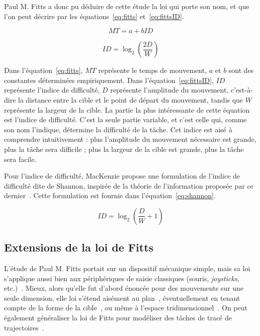 	Paul M. Fitts a donc pu déduire de cette étude la loi qui porte son nom, et que l'on peut décrire par les équations~\ref{eq:fitts} et~\ref{eq:fittsID}.
	
	\begin{equation}
		\label{eq:fitts}
		MT = a + bID
	\end{equation}
	
	\begin{equation}
		\label{eq:fittsID}
		ID = \log_2\left(\frac{2D}{W} \right)
	\end{equation}
	
	Dans l'équation~\ref{eq:fitts}, $MT$ représente le temps de mouvement, $a$ et $b$ sont des constantes déterminées empiriquement. Dans l'équation~\ref{eq:fittsID}, $ID$ représente l'indice de difficulté, $D$ représente l'amplitude du mouvement, c'est-à-dire la distance entre la cible et le point de départ du mouvement, tandis que $W$ représente la largeur de la cible. La partie la plus intéressante de cette équation est l'indice de difficulté. C'est la seule partie variable, et c'est celle qui, comme son nom l'indique, détermine la difficulté de la tâche. Cet indice est aisé à comprendre intuitivement : plus l'amplitude du mouvement nécessaire est grande, plus la tâche sera difficile ; plus la largeur de la cible est grande, plus la tâche sera facile.
	
	Pour l'indice de difficulté, MacKenzie propose une formulation de l'indice de difficulté dite de Shannon, inspirée de la théorie de l'information proposée par ce dernier~\cite{mackenzie1989note}. Cette formulation est fournie dans l'équation~\ref{eq:shannon}.
	
	\begin{equation}
		\label{eq:shannon}
		ID = \log_2\left(\frac{D}{W} + 1\right)
	\end{equation}
	
	\subsection{Extensions de la loi de Fitts}
	L'étude de Paul M. Fitts portait sur un dispositif mécanique simple, mais sa loi s'applique aussi bien aux périphériques de saisie classiques (souris, \emph{joysticks}, etc.)~\cite{card1978evaluation}. Mieux, alors qu'elle fut d'abord énoncée pour des mouvements sur une seule dimension, elle loi s'étend aisément au plan~\cite{card1978evaluation, mackenzie1992extending}, éventuellement en tenant compte de la forme de la cible~\cite{accot2003refining}, ou même à l'espace tridimensionnel~\cite{murata2001extending}. On peut également généraliser la loi de Fitts pour modéliser des tâches de tracé de trajectoires~\cite{accot1997beyond, accot1999performance}.
	
